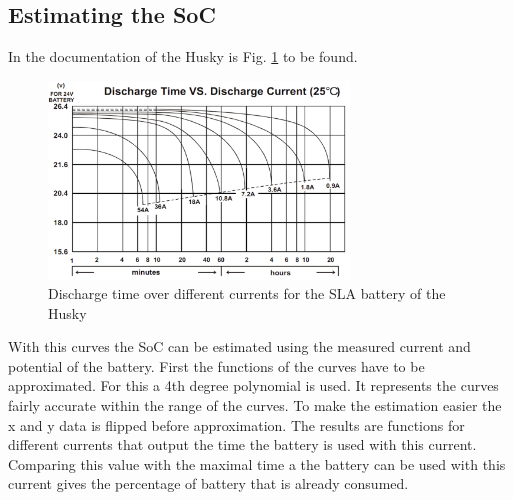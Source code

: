 \documentclass[conference]{IEEEtran}
\begin{document}
\subsection{Estimating the SoC}
In the documentation of the Husky is Fig. \ref{fig:EndladekuvenSLA} to be found.
\begin{figure}[htbp]
    \centerline{\includegraphics[width=8cm]{Pictures/EndladekuvenSLA.png}}
    \caption{Discharge time over different currents for the SLA battery of the Husky \cite[p.21]{SLAKurven}}
    \label{fig:EndladekuvenSLA}
\end{figure}
With this curves the SoC can be estimated using the measured current and potential of the battery.
First the functions of the curves have to be approximated. For this a 4th degree polynomial is used.
It represents the curves fairly accurate within the range of the curves.
To make the estimation easier the x and y data is flipped before approximation.
The results are functions for different currents that output the time the battery is used with this current.
Comparing this value with the maximal time a the battery can be used with this current gives the percentage of battery that is already consumed.
\end{document}

